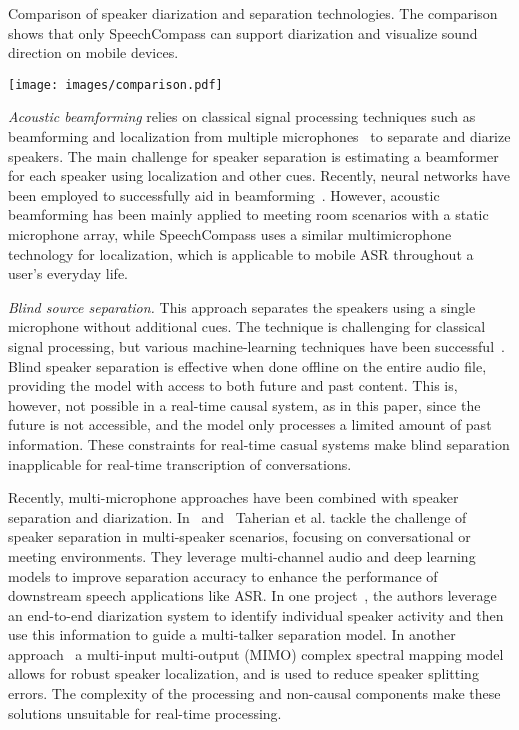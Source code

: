 \begin{table*}
  \centering
\caption{Comparison of speaker diarization and separation technologies. The comparison shows that only SpeechCompass can support diarization and visualize sound direction on mobile devices. }
  \label{table:tech_comparison}  
  \texttt{[image: images/comparison.pdf]}
  
\end{table*}


\textit{Acoustic beamforming} relies on classical signal processing techniques such as beamforming and localization from multiple microphones~\cite{anguera2007acoustic} to separate and diarize speakers. The main challenge for speaker separation is estimating a beamformer for each speaker using localization and other cues. Recently, neural networks have been employed to successfully aid in beamforming~\cite{heymann2016neural, yang2024binaural}. However, acoustic beamforming has been mainly applied to meeting room scenarios with a static microphone array, while SpeechCompass uses a similar multimicrophone technology for localization, which is applicable to mobile ASR throughout a user's everyday life. 



\textit{Blind source separation.}
This approach separates the speakers using a single microphone without additional cues. The technique is challenging for classical signal processing, but various machine-learning techniques have been successful~\cite{erdogan2015phase, isik2016single}. Blind speaker separation is effective when done offline on the entire audio file, providing the model with access to both future and past content. This is, however, not possible in a real-time causal system, as in this paper, since the future is not accessible, and the model only processes a limited amount of past information. These constraints for real-time casual systems make blind separation inapplicable for real-time transcription of conversations.%

Recently, multi-microphone approaches have been combined with speaker separation and diarization. In~\cite{10446934} and~\cite{10508438} Taherian et al. tackle the challenge of speaker separation in multi-speaker scenarios, focusing on conversational or meeting environments. They leverage multi-channel audio and deep learning models to improve separation accuracy to enhance the performance of downstream speech applications like ASR. In one project~\cite{10446934}, the authors leverage an end-to-end diarization system to identify individual speaker activity and then use this information to guide a multi-talker separation model. In another approach~\cite{10508438} a multi-input multi-output (MIMO) complex spectral mapping model allows for robust speaker localization, and is used to reduce speaker splitting errors. The complexity of the processing and non-causal components make these solutions unsuitable for real-time processing.

